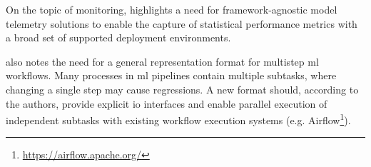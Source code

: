 On the topic of monitoring, \cite{Chen2020} highlights a need for framework-agnostic model telemetry solutions to enable the capture of statistical performance metrics with a broad set of supported deployment environments.

\cite{Chen2020} also notes the need for a general representation format for multistep \acrshort{ml} workflows.
Many processes in \acrshort{ml} pipelines contain multiple subtasks, where changing a single step may cause regressions.
A new format should, according to the authors, provide explicit \acrshort{io} interfaces and enable parallel execution of independent subtasks with existing workflow execution systems (e.g. Airflow\footnote{\url{https://airflow.apache.org/}}).